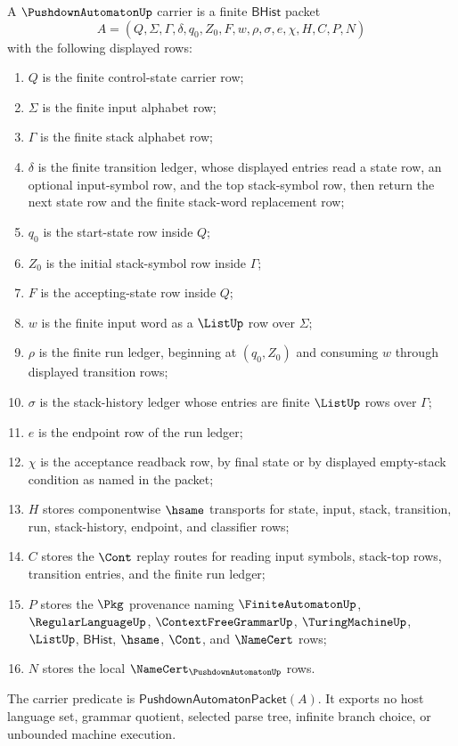 \begin{definition}
\label{def:pushdown-automaton-carrier}
A $\PushdownAutomatonUp$ carrier is a finite $\mathsf{BHist}$ packet
$$
A=(Q,\Sigma,\Gamma,\delta,q_0,Z_0,F,w,\rho,\sigma,e,\chi,H,C,P,N)
$$
with the following displayed rows:
\begin{enumerate}
\item $Q$ is the finite control-state carrier row;
\item $\Sigma$ is the finite input alphabet row;
\item $\Gamma$ is the finite stack alphabet row;
\item $\delta$ is the finite transition ledger, whose displayed entries read
  a state row, an optional input-symbol row, and the top stack-symbol row, then
  return the next state row and the finite stack-word replacement row;
\item $q_0$ is the start-state row inside $Q$;
\item $Z_0$ is the initial stack-symbol row inside $\Gamma$;
\item $F$ is the accepting-state row inside $Q$;
\item $w$ is the finite input word as a $\ListUp$ row over $\Sigma$;
\item $\rho$ is the finite run ledger, beginning at $(q_0,Z_0)$ and consuming
  $w$ through displayed transition rows;
\item $\sigma$ is the stack-history ledger whose entries are finite $\ListUp$
  rows over $\Gamma$;
\item $e$ is the endpoint row of the run ledger;
\item $\chi$ is the acceptance readback row, by final state or by displayed
  empty-stack condition as named in the packet;
\item $H$ stores componentwise $\hsame$ transports for state, input, stack,
  transition, run, stack-history, endpoint, and classifier rows;
\item $C$ stores the $\Cont$ replay routes for reading input symbols,
  stack-top rows, transition entries, and the finite run ledger;
\item $P$ stores the $\Pkg$ provenance naming $\FiniteAutomatonUp$,
  $\RegularLanguageUp$, $\ContextFreeGrammarUp$, $\TuringMachineUp$,
  $\ListUp$, $\mathsf{BHist}$, $\hsame$, $\Cont$, and $\NameCert$ rows;
\item $N$ stores the local $\NameCert_{\PushdownAutomatonUp}$ rows.
\end{enumerate}
The carrier predicate is $\mathsf{PushdownAutomatonPacket}(A)$. It exports no
host language set, grammar quotient, selected parse tree, infinite branch
choice, or unbounded machine execution.
\end{definition}

